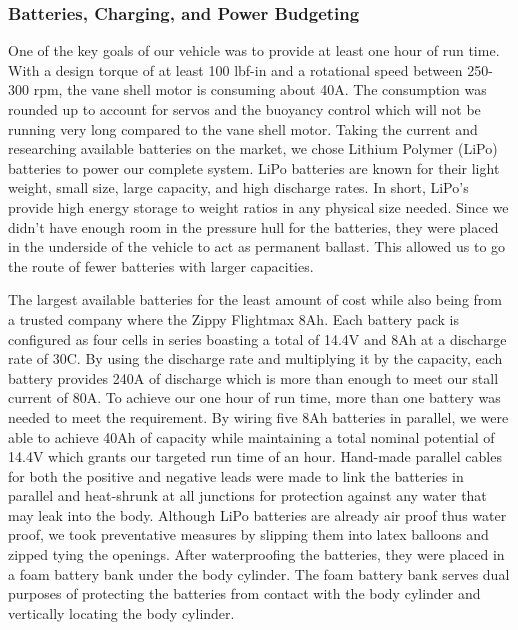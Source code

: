 \documentclass{report}
\begin{document}
\subsubsection{Batteries, Charging, and Power Budgeting}
One of the key goals of our vehicle was to provide at least one hour of run time.  With a design torque of at least 100 lbf-in and a rotational speed between 250-300 rpm, the vane shell motor is consuming about 40A.  The consumption was rounded up to account for servos and the buoyancy control which will not be running very long compared to the vane shell motor.  Taking the current and researching available batteries on the market, we chose Lithium Polymer (LiPo) batteries to power our complete system.  LiPo batteries are known for their light weight, small size, large capacity, and high discharge rates.  In short, LiPo’s provide high energy storage to weight ratios in any physical size needed.  Since we didn’t have enough room in the pressure hull for the batteries, they were placed in the underside of the vehicle to act as permanent ballast.  This allowed us to go the route of fewer batteries with larger capacities.\par
The largest available batteries for the least amount of cost while also being from a trusted company where the Zippy Flightmax 8Ah.  Each battery pack is configured as four cells in series boasting a total of 14.4V and 8Ah at a discharge rate of 30C.  By using the discharge rate and multiplying it by the capacity, each battery provides 240A of discharge which is more than enough to meet our stall current of 80A.  To achieve our one hour of run time, more than one battery was needed to meet the requirement.  By wiring five 8Ah batteries in parallel, we were able to achieve 40Ah of capacity while maintaining a total nominal potential of 14.4V which grants our targeted run time of an hour.  Hand-made parallel cables for both the positive and negative leads were made to link the batteries in parallel and heat-shrunk at all junctions for protection against any water that may leak into the body.  Although LiPo batteries are already air proof thus water proof, we took preventative measures by slipping them into latex balloons and zipped tying the openings.  After waterproofing the batteries, they were placed in a foam battery bank under the body cylinder.  The foam battery bank serves dual purposes of protecting the batteries from contact with the body cylinder and vertically locating the body cylinder.\par
\end{document}
